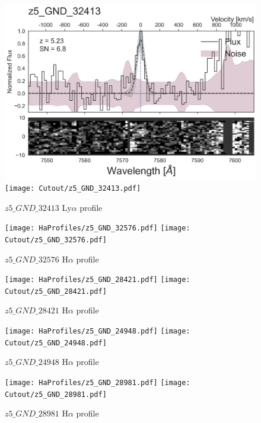 \documentclass[12pt,english]{article}
\begin{document}
\begin{figure}
\begin{center}\includegraphics[width=12cm, trim=0.1cm 0cm 0cm -1cm]{LyaProfiles/z5_GND_32413.png}
\texttt{[image: Cutout/z5\_GND\_32413.pdf]}
\caption{$z5\_GND\_32413$ Ly$\alpha$ profile}
\end{center}
\end{figure}
\clearpage
\begin{figure}
\begin{center}\texttt{[image: HaProfiles/z5\_GND\_32576.pdf]}
\texttt{[image: Cutout/z5\_GND\_32576.pdf]}
\caption{$z5\_GND\_32576$ H$\alpha$ profile}
\end{center}
\end{figure}
\clearpage
\begin{figure}
\begin{center}\texttt{[image: HaProfiles/z5\_GND\_28421.pdf]}
\texttt{[image: Cutout/z5\_GND\_28421.pdf]}
\caption{$z5\_GND\_28421$ H$\alpha$ profile}
\end{center}
\end{figure}
\clearpage
\begin{figure}
\begin{center}\texttt{[image: HaProfiles/z5\_GND\_24948.pdf]}
\texttt{[image: Cutout/z5\_GND\_24948.pdf]}
\caption{$z5\_GND\_24948$ H$\alpha$ profile}
\end{center}
\end{figure}
\clearpage
\begin{figure}
\begin{center}\texttt{[image: HaProfiles/z5\_GND\_28981.pdf]}
\texttt{[image: Cutout/z5\_GND\_28981.pdf]}
\caption{$z5\_GND\_28981$ H$\alpha$ profile}
\end{center}
\end{figure}
\end{document}
